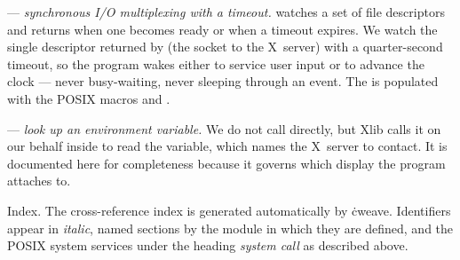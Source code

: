 \fi

 --- {\it synchronous I/O multiplexing with a
timeout.}
 watches a set of file descriptors and returns when one becomes
ready or when a timeout expires.  We watch the single descriptor returned
by  (the socket to the X~server) with a quarter-second
timeout, so the program wakes either to service user input or to advance
the clock --- never busy-waiting, never sleeping through an event.  The
 is populated with the POSIX macros  and .

\fi

 --- {\it look up an environment variable.}
We do not call  directly, but Xlib calls it on our behalf inside
 to read the  variable, which names the
X~server to
contact.  It is documented here for completeness because it governs which
display the program attaches to.

\fi

Index.
The cross-reference index is generated automatically by \.{cweave}.
Identifiers appear in {\it italic}, named sections by the module in which
they are defined, and the POSIX system services under the heading
{\it system call} as described above.
\fi

\inx
\fin
\con
